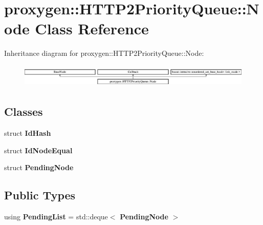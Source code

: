 \section{proxygen\+:\+:H\+T\+T\+P2\+Priority\+Queue\+:\+:Node Class Reference}
\label{classproxygen_1_1HTTP2PriorityQueue_1_1Node}
Inheritance diagram for proxygen\+:\+:H\+T\+T\+P2\+Priority\+Queue\+:\+:Node\+:\begin{figure}[H]
\begin{center}
\leavevmode
\includegraphics[height=1.098039cm]{classproxygen_1_1HTTP2PriorityQueue_1_1Node}
\end{center}
\end{figure}
\subsection*{Classes}
\begin{DoxyCompactItemize}
\item 
struct {\bf Id\+Hash}
\item 
struct {\bf Id\+Node\+Equal}
\item 
struct {\bf Pending\+Node}
\end{DoxyCompactItemize}
\subsection*{Public Types}
\begin{DoxyCompactItemize}
\item 
using {\bf Pending\+List} = std\+::deque$<$ {\bf Pending\+Node} $>$
\end{DoxyCompactItemize}
